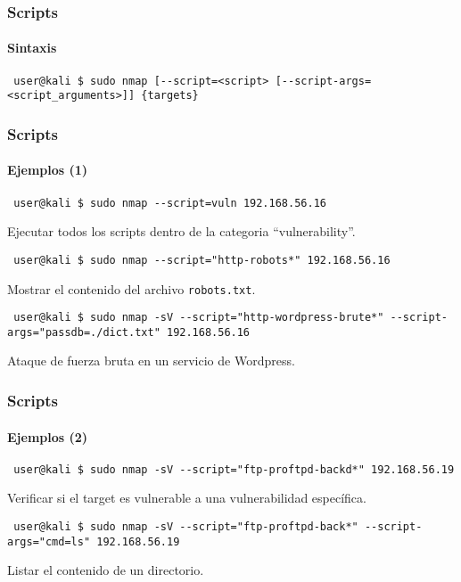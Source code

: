 \documentclass[aspectratio=169]{beamer}
\begin{document}
\begin{frame}[fragile]
    \frametitle{Scripts}
    \framesubtitle{Sintaxis}

    \begin{lstlisting}
 user@kali $ sudo nmap [--script=<script> [--script-args=<script_arguments>]] {targets}
    \end{lstlisting}

\end{frame}


\begin{frame}[fragile]
    \frametitle{Scripts}
    
    \framesubtitle{Ejemplos (1)}

    \begin{lstlisting}
 user@kali $ sudo nmap --script=vuln 192.168.56.16
    \end{lstlisting}

    Ejecutar todos los scripts dentro de la categoria ``vulnerability''.

    \pause

    \begin{lstlisting}
 user@kali $ sudo nmap --script="http-robots*" 192.168.56.16
    \end{lstlisting}

    Mostrar el contenido del archivo \texttt{robots.txt}.

    \pause

    \begin{lstlisting}
 user@kali $ sudo nmap -sV --script="http-wordpress-brute*" --script-args="passdb=./dict.txt" 192.168.56.16
    \end{lstlisting}
       
    Ataque de fuerza bruta en un servicio de Wordpress.

\end{frame}

\begin{frame}[fragile]
    \frametitle{Scripts}
    
    \framesubtitle{Ejemplos (2)}

    \begin{lstlisting}
 user@kali $ sudo nmap -sV --script="ftp-proftpd-backd*" 192.168.56.19
    \end{lstlisting}

    Verificar si el target es vulnerable a una vulnerabilidad espec\'ifica.

    \pause       

    \begin{lstlisting}
 user@kali $ sudo nmap -sV --script="ftp-proftpd-back*" --script-args="cmd=ls" 192.168.56.19
    \end{lstlisting}

    Listar el contenido de un directorio.

\end{frame}
\end{document}
